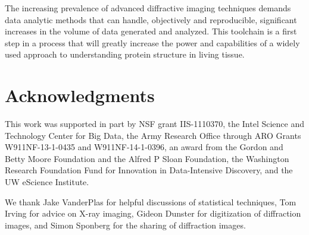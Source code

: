 \documentclass{llncs}
\begin{document}
The increasing prevalence of advanced diffractive imaging techniques
demands data analytic methods that can handle, objectively and
reproducible, significant increases in the volume of data generated
and analyzed. This toolchain is a first step in a process that will
greatly increase the power and capabilities of a widely used approach
to understanding protein structure in living tissue. 

\section{Acknowledgments}
\label{sec:acknowledgments}

This work was supported in part by NSF grant IIS-1110370, the Intel
Science and Technology Center for Big Data, the Army Research Office
through ARO Grants W911NF-13-1-0435 and W911NF-14-1-0396, an award
from the Gordon and Betty Moore Foundation and the Alfred P Sloan
Foundation, the Washington Research Foundation Fund for Innovation in
Data-Intensive Discovery, and the UW eScience Institute.

We thank Jake VanderPlas for helpful discussions of statistical
techniques, Tom Irving for advice on X-ray imaging, Gideon Dunster for
digitization of diffraction images, and Simon Sponberg for the sharing
of diffraction images. 


\scriptsize


\end{document}
